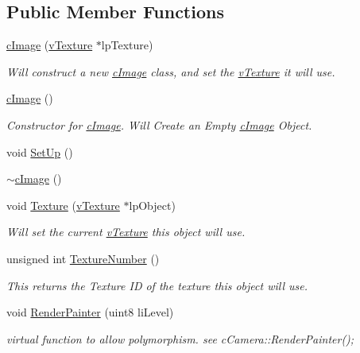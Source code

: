 \subsection*{Public Member Functions}
\begin{DoxyCompactItemize}
\item 
\hyperlink{classc_image_a81e879417b1ad5d26ea87473e24661f0}{cImage} (\hyperlink{classv_texture}{vTexture} $\ast$lpTexture)
\begin{DoxyCompactList}\small\item\em Will construct a new \hyperlink{classc_image}{cImage} class, and set the \hyperlink{classv_texture}{vTexture} it will use. \item\end{DoxyCompactList}\item 
\hyperlink{classc_image_a7acf286a86645d8acb39a7b02b06ac0a}{cImage} ()
\begin{DoxyCompactList}\small\item\em Constructor for \hyperlink{classc_image}{cImage}. Will Create an Empty \hyperlink{classc_image}{cImage} Object. \item\end{DoxyCompactList}\item 
void \hyperlink{classc_image_a8ac629e963781df72f6f478c119dc491}{SetUp} ()
\item 
\hyperlink{classc_image_a9468d68a070861ee06cad9db7121e343}{$\sim$cImage} ()
\item 
void \hyperlink{classc_image_a69d2d35f01ef19317cee9f8b8abd57f3}{Texture} (\hyperlink{classv_texture}{vTexture} $\ast$lpObject)
\begin{DoxyCompactList}\small\item\em Will set the current \hyperlink{classv_texture}{vTexture} this object will use. \item\end{DoxyCompactList}\item 
unsigned int \hyperlink{classc_image_abc6c49a11e077d8c945cb8b7d814db77}{TextureNumber} ()
\begin{DoxyCompactList}\small\item\em This returns the Texture ID of the texture this object will use. \item\end{DoxyCompactList}\item 
void \hyperlink{classc_image_a49202e61cb4fd9ada4d69d0aa6bad601}{RenderPainter} (uint8 liLevel)
\begin{DoxyCompactList}\small\item\em virtual function to allow polymorphism. see cCamera::RenderPainter(); \item\end{DoxyCompactList}\item 

\end{DoxyCompactItemize}
